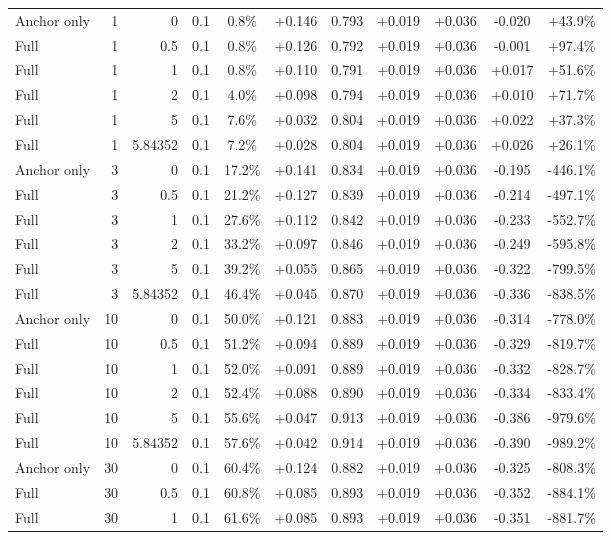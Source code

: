 \begin{table}[htbp]
\begin{tabular}{lrrrccccccc}
Anchor only & 1 & 0 & 0.1 & 0.8\% & +0.146 & 0.793 & +0.019 & +0.036 & -0.020 & +43.9\% \\
Full & 1 & 0.5 & 0.1 & 0.8\% & +0.126 & 0.792 & +0.019 & +0.036 & -0.001 & +97.4\% \\
Full & 1 & 1 & 0.1 & 0.8\% & +0.110 & 0.791 & +0.019 & +0.036 & +0.017 & +51.6\% \\
Full & 1 & 2 & 0.1 & 4.0\% & +0.098 & 0.794 & +0.019 & +0.036 & +0.010 & +71.7\% \\
Full & 1 & 5 & 0.1 & 7.6\% & +0.032 & 0.804 & +0.019 & +0.036 & +0.022 & +37.3\% \\
Full & 1 & 5.84352 & 0.1 & 7.2\% & +0.028 & 0.804 & +0.019 & +0.036 & +0.026 & +26.1\% \\
Anchor only & 3 & 0 & 0.1 & 17.2\% & +0.141 & 0.834 & +0.019 & +0.036 & -0.195 & -446.1\% \\
Full & 3 & 0.5 & 0.1 & 21.2\% & +0.127 & 0.839 & +0.019 & +0.036 & -0.214 & -497.1\% \\
Full & 3 & 1 & 0.1 & 27.6\% & +0.112 & 0.842 & +0.019 & +0.036 & -0.233 & -552.7\% \\
Full & 3 & 2 & 0.1 & 33.2\% & +0.097 & 0.846 & +0.019 & +0.036 & -0.249 & -595.8\% \\
Full & 3 & 5 & 0.1 & 39.2\% & +0.055 & 0.865 & +0.019 & +0.036 & -0.322 & -799.5\% \\
Full & 3 & 5.84352 & 0.1 & 46.4\% & +0.045 & 0.870 & +0.019 & +0.036 & -0.336 & -838.5\% \\
Anchor only & 10 & 0 & 0.1 & 50.0\% & +0.121 & 0.883 & +0.019 & +0.036 & -0.314 & -778.0\% \\
Full & 10 & 0.5 & 0.1 & 51.2\% & +0.094 & 0.889 & +0.019 & +0.036 & -0.329 & -819.7\% \\
Full & 10 & 1 & 0.1 & 52.0\% & +0.091 & 0.889 & +0.019 & +0.036 & -0.332 & -828.7\% \\
Full & 10 & 2 & 0.1 & 52.4\% & +0.088 & 0.890 & +0.019 & +0.036 & -0.334 & -833.4\% \\
Full & 10 & 5 & 0.1 & 55.6\% & +0.047 & 0.913 & +0.019 & +0.036 & -0.386 & -979.6\% \\
Full & 10 & 5.84352 & 0.1 & 57.6\% & +0.042 & 0.914 & +0.019 & +0.036 & -0.390 & -989.2\% \\
Anchor only & 30 & 0 & 0.1 & 60.4\% & +0.124 & 0.882 & +0.019 & +0.036 & -0.325 & -808.3\% \\
Full & 30 & 0.5 & 0.1 & 60.8\% & +0.085 & 0.893 & +0.019 & +0.036 & -0.352 & -884.1\% \\
Full & 30 & 1 & 0.1 & 61.6\% & +0.085 & 0.893 & +0.019 & +0.036 & -0.351 & -881.7\% \\

\end{tabular}
\end{table}
